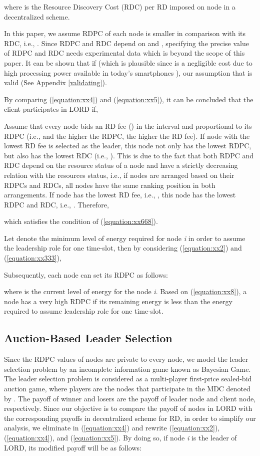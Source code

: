 \documentclass[journal,12pt, onecolumn]{IEEEtran}
\begin{document}
where  is the Resource Discovery Cost (RDC) per RD imposed on node  in a decentralized scheme.

In this paper, we assume RDPC of each node is smaller in comparison with its RDC, i.e., . Since RDPC and RDC depend on  and , specifying the precise value of RDPC and RDC needs experimental data which is beyond the scope of this paper. It can be shown that if  (which is plausible since  is a negligible cost due to high processing power available in today's smartphones \cite{x29}), our assumption that  is valid (See Appendix \ref{validating}).

By comparing (\ref{equation:xx4}) and (\ref{equation:xx5}), it can be concluded that the client  participates in LORD if, 
 

Assume that every node  bids an RD fee () in the interval  and proportional to its RDPC (i.e.,  and the higher the RDPC, the higher the RD fee). If node  with the lowest RD fee is selected as the leader, this node not only has the lowest RDPC, but also has the lowest RDC (i.e., ). This is due to the fact that both RDPC and RDC depend on the resource status of a node and have a strictly decreasing relation with the resources status, i.e., if nodes are arranged based on their RDPCs and RDCs, all nodes have the same ranking position in both arrangements. 
If node  has the lowest RD fee, i.e., , this node has the lowest RDPC and RDC, i.e., . Therefore,
 
which satisfies the condition of (\ref{equation:xx668}).




Let  denote the minimum level of energy required for node \textit{i} in order to assume the leadership role for one time-slot, then by considering (\ref{equation:xx2}) and (\ref{equation:xx333}),
 
Subsequently, each node can set its RDPC as follows: 

where  is the current level of energy for the node \textit{i}. Based on (\ref{equation:xx8}), a node has a very high RDPC if its remaining energy is less than the energy required to assume leadership role for one time-slot.

\subsection{Auction-Based Leader Selection}
\label{section:Leader Selection Game}
Since the RDPC values of nodes are private to every node, we model the leader selection problem by an incomplete information game known as Bayesian Game. The leader selection problem is considered as a multi-player first-price sealed-bid auction game, where players are the nodes that participate in the MDC denoted by . The payoff of winner and losers are the payoff of leader node and client node, respectively. Since our objective is to compare the payoff of nodes in LORD with the corresponding payoffs in decentralized scheme for RD, in order to simplify our analysis, we eliminate  in (\ref{equation:xx4}) and rewrite (\ref{equation:xx2}), (\ref{equation:xx4}), and (\ref{equation:xx5}). By doing so, if node \textit{i} is the leader of LORD, its modified payoff will be as follows: 
\end{document}
